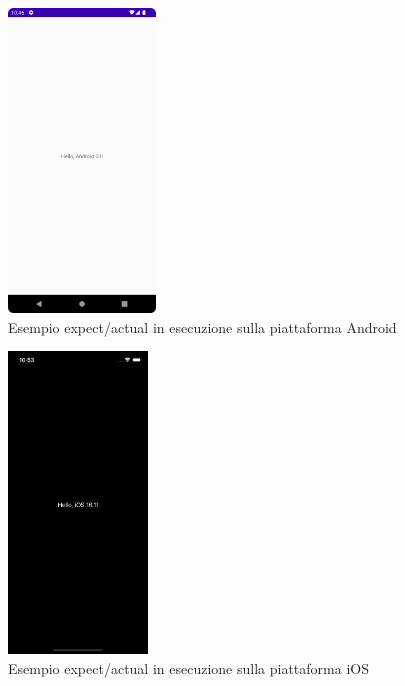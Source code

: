 \begin{multicols}{2}
    \begin{figure}[H]
        \centering
        \includegraphics[width=0.35\textwidth]{img/kmm_example_android.png}
        \caption{Esempio expect/actual in esecuzione sulla piattaforma Android}
        \label{expect-actual-android}
    \end{figure}

    \begin{figure}[H]
        \centering
        \includegraphics[width=0.33\textwidth]{img/kmm_example_ios_dark.png}
        \caption{Esempio expect/actual in esecuzione sulla piattaforma iOS}
        \label{expect-actual-ios}
    \end{figure}
\end{multicols}


